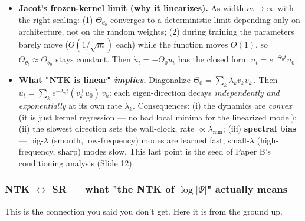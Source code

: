 \documentclass[11pt]{article}
\begin{document}
\begin{itemize}
\begin{itemize}
actually forms; see below).
\item \textbf{Acting on the residual function} $u_t$, $\;(\Theta u)(x) = \sum_{x'}
    \Theta(x,x') u(x')$, it is an \textbf{integral operator} on function space.
The equation $\dot u_t = -\Theta u_t$ is therefore a linear ODE *in
function space*. So: kernel = the recipe $\Theta(x,x')$; operator =
what it does when it acts on $u$; matrix = its restriction to your
sample points.
\end{itemize}
\item \textbf{Jacot's frozen-kernel limit (why it linearizes).} As width $m \to
  \infty$ with the right scaling: (1) $\Theta_{\theta_0}$ converges to a
deterministic limit depending only on architecture, not on the random
weights; (2) during training the parameters barely move ($O(1/\sqrt m)$
each) while the function moves $O(1)$, so $\Theta_{\theta_t} \approx
  \Theta_{\theta_0}$ stays constant. Then $\dot u_t = -\Theta_0 u_t$ has the
closed form $u_t = e^{-\Theta_0 t} u_0$.
\item \textbf{What "NTK is linear" \emph{implies}.} Diagonalize $\Theta_0 = \sum_k
  \lambda_k v_k v_k^\top$. Then $u_t = \sum_k e^{-\lambda_k t}(v_k^\top
  u_0)\,v_k$: each eigen-direction decays \emph{independently and exponentially}
at its own rate $\lambda_k$. Consequences: (i) the dynamics are \emph{convex}
(it is just kernel regression --- no bad local minima for the linearized
model); (ii) the slowest direction sets the wall-clock, rate $\propto
  \lambda_{\min}$; (iii) \textbf{spectral bias} --- big-$\lambda$ (smooth,
low-frequency) modes are learned fast, small-$\lambda$ (high-frequency,
sharp) modes slow. This last point is the seed of Paper B's conditioning
analysis (Slide 12).
\end{itemize}
\subsubsection*{NTK $\leftrightarrow$ SR --- what "the NTK of $\log|\Psi|$" actually means}

This is the connection you said you don't get. Here it is from the ground
up.
\end{document}

